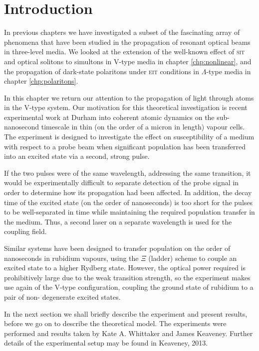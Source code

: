\section{Introduction}
  \label{sec:simultons_intro}

    In previous chapters we have investigated a subset of the fascinating array
    of phenomena that have been studied in the propagation of resonant optical
    beams in three-level media. We looked at the extension of the well-known
    effect of \textsc{sit} and optical solitons to simultons in V-type media in
    chapter \ref{chp:nonlinear}, and the propagation of dark-state polaritons
    under \textsc{eit} conditions in $\Lambda$-type media in chapter
    \ref{chp:polaritons}.


    In this chapter we return our attention to the propagation of light through
    atoms in the V-type system. Our motivation for this theoretical
    investigation is recent experimental work at Durham into coherent atomic
    dynamics on the sub-nanosecond timescale in thin (on the order of a micron
    in length) vapour cells.\cite{Keaveney2013} The experiment is designed to
    investigate the effect on susceptibility of a medium with respect to a probe
    beam when significant population has been transferred into an excited state
    via a second, strong pulse.

    If the two pulses were of the same wavelength, addressing the same
    transition, it would be experimentally difficult to separate detection of
    the probe signal in order to determine how its propagation had been
    affected. In addition, the decay time of the excited state (on the order of
    nanoseconds) is too short for the pulses to be well-separated in time while
    maintaining the required population transfer in the medium. Thus, a second
    laser on a separate wavelength is used for the coupling field.

    Similar systems have been designed to transfer population on the order of
    nanoseconds in rubidium vapours, using the $\Xi$ (ladder) scheme to couple an
    excited state to a higher Rydberg state.\cite{Huber2011,Baluktsian2013}
    However, the optical power required is prohibitively large due to the weak
    transition strength, so the experiment makes use again of the V-type
    configuration, coupling the ground state of rubidium to a pair of non-
    degenerate excited states.

    In the next section we shall briefly describe the experiment and present
    results, before we go on to describe the theoretical model. The experiments
    were performed and results taken by Kate A. Whittaker and James Keaveney.
    Further details of the experimental setup may be found in Keaveney,
    2013.\cite{Keaveney2013}
